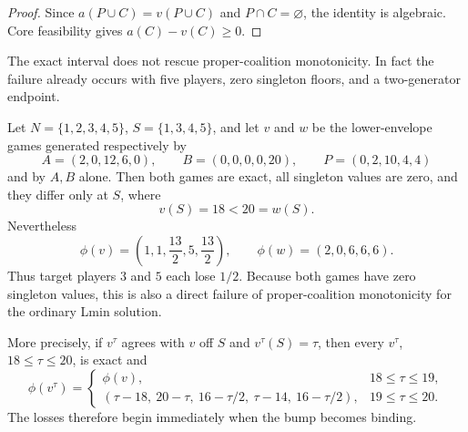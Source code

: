 \begin{proof}
Since $a(P\cup C)=v(P\cup C)$ and $P\cap C=\varnothing$, the identity is
algebraic.  Core feasibility gives $a(C)-v(C)\geq0$.
\end{proof}

The exact interval does not rescue proper-coalition monotonicity.  In fact the
failure already occurs with five players, zero singleton floors, and a
two-generator endpoint.

\begin{theorem}
\label{thm:lx-proper-exact-fails}
Let $N=\{1,2,3,4,5\}$, $S=\{1,3,4,5\}$, and let $v$ and $w$ be the
lower-envelope games generated respectively by
\[
 A=(2,0,12,6,0),\qquad B=(0,0,0,0,20),\qquad
 P=(0,2,10,4,4)
\]
and by $A,B$ alone.  Then both games are exact, all singleton values are zero,
and they differ only at $S$, where
\[
 v(S)=18<20=w(S).
\]
Nevertheless
\[
 \phi(v)=\left(1,1,\frac{13}{2},5,\frac{13}{2}\right),
 \qquad
 \phi(w)=(2,0,6,6,6).
 \tag{PM}\label{eq:lx-proper-exact-counterexample}
\]
Thus target players $3$ and $5$ each lose $1/2$.
Because both games have zero singleton values, this is also a direct failure
of proper-coalition monotonicity for the ordinary Lmin solution.

More precisely, if $v^\tau$ agrees with $v$ off $S$ and
$v^\tau(S)=\tau$, then every $v^\tau$, $18\leq\tau\leq20$, is exact and
\[
 \phi(v^\tau)=
 \begin{cases}
  \phi(v),&18\leq\tau\leq19,\\[2mm]
  (\tau-18,\ 20-\tau,\ 16-\tau/2,\ \tau-14,\ 16-\tau/2),
       &19\leq\tau\leq20.
 \end{cases}
 \tag{PP}\label{eq:lx-proper-exact-path}
\]
The losses therefore begin immediately when the bump becomes binding.
\end{theorem}

